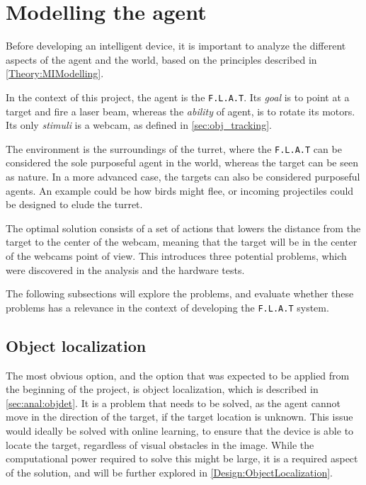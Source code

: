 \section{Modelling the agent}\label{Design:MI}
Before developing an intelligent device, it is important to analyze the different aspects of the agent and the world, based on the principles described in \autoref{Theory:MIModelling}.


In the context of this project, the agent is the \texttt{F.L.A.T}.
Its \textit{goal} is to point at a target and fire a laser beam, whereas the \textit{ability} of agent, is to rotate its motors.
Its only \textit{stimuli} is a webcam, as defined in \autoref{sec:obj_tracking}.

The environment is the surroundings of the turret, where the \texttt{F.L.A.T} can be considered the sole purposeful agent in the world, whereas the target can be seen as nature.
In a more advanced case, the targets can also be considered purposeful agents.
An example could be how birds might flee, or incoming projectiles could be designed to elude the turret.

The optimal solution consists of a set of actions that lowers the distance from the target to the center of the webcam, meaning that the target will be in the center of the webcams point of view.
This introduces three potential problems, which were discovered in the analysis and the hardware tests.

The following subsections will explore the problems, and evaluate whether these problems has a relevance in the context of developing the \texttt{F.L.A.T} system. 


\subsection{Object localization}

The most obvious option, and the option that was expected to be applied from the beginning of the project, is object localization, which is described in \autoref{sec:anal:objdet}.
It is a problem that needs to be solved, as the agent cannot move in the direction of the target, if the target location is unknown.
This issue would ideally be solved with online learning, to ensure that the device is able to locate the target, regardless of visual obstacles in the image.
While the computational power required to solve this might be large, it is a required aspect of the solution, and will be further explored in \autoref{Design:ObjectLocalization}.

